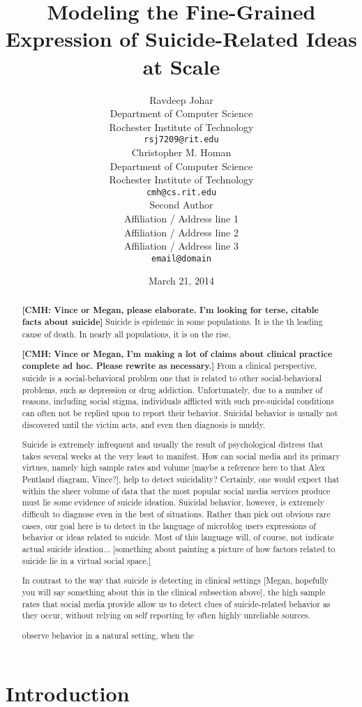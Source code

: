 \documentclass[11pt]{article}
\title{Modeling the Fine-Grained Expression of Suicide-Related Ideas at Scale}
\author{Ravdeep Johar\\
  Department of Computer Science \\
  Rochester Institute of Technology \\
  {\tt rsj7209@rit.edu} \\\And
 Christopher M. Homan\\
  Department of Computer Science \\
  Rochester Institute of Technology \\
  {\tt cmh@cs.rit.edu}\\\And
  Second Author \\
  Affiliation / Address line 1 \\
  Affiliation / Address line 2 \\
  Affiliation / Address line 3 \\
  {\tt email@domain} \\}
\date{March 21, 2014}
\begin{document}
\maketitle
\begin{abstract}
 \textbf{[CMH: Vince or Megan, please elaborate. I'm looking for terse, citable facts about suicide]} Suicide is epidemic in some populations. It is the th leading cause of death. In nearly all populations, it is on the rise.

\textbf{[CMH: Vince or Megan, I'm making a lot of claims about clinical practice complete ad hoc. Please rewrite as necessary.]} From a clinical perspective, suicide is a social-behavioral problem one that is related to other social-behavioral problems, such as depression or drug addiction. Unfortunately, due to a number of reasons, including social stigma, individuals afflicted with such pre-suicidal conditions can often not be replied upon to report their behavior.  Suicidal behavior is usually not discovered until the victim acts, and even then diagnosis is muddy. 

Suicide is extremely infrequent and usually the result of psychological distress that takes several weeks at the very least to manifest. How can social media and its primary virtues, namely high sample rates and volume [maybe a reference here to that Alex Pentland diagram, Vince?], help to detect suicidality? Certainly, one would expect that within the sheer volume of data that the most popular social media services produce must lie some evidence of suicide ideation. Suicidal behavior, however, is extremely difficult to diagnose even in the best of situations. Rather than pick out obvious rare cases, our goal here is to detect in the language of microblog users expressions 
of behavior or ideas related to suicide. Most of this language will, of course, not indicate actual suicide ideation... [something about painting a picture of how factors related to suicide lie in a virtual social space.]

In contrast to the way that suicide is detecting in clinical settings [Megan, hopefully you will say something about this in the clinical subsection above], the high sample rates that social media provide allow us to detect clues of suicide-related behavior as they occur, without relying on self reporting by often highly unreliable sources. 

observe behavior
in a natural setting, when the 
\end{abstract}

\section{Introduction}
\end{document}
